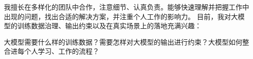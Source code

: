 

\begin{cvparagraph}

我擅长在多样化的团队中合作，注意细节、认真负责。能够快速理解并把握工作中出现的问题，找出合适的解决方案，并注重个人工作的影响力。
目前，我对大模型的训练数据治理、输出约束以及在真实场景上的落地充满兴趣：

大模型需要什么样的训练数据？需要怎样对大模型的输出进行约束？大模型如何整合进每个人学习、工作的流程？

\end{cvparagraph}
